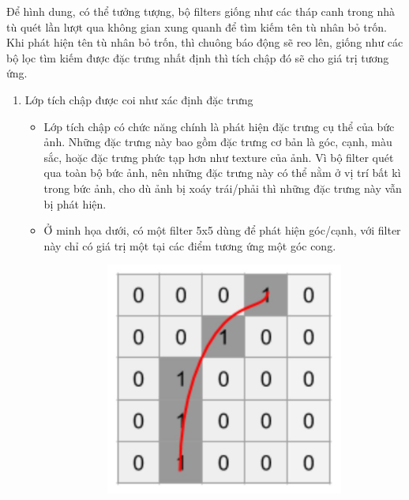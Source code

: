 Để hình dung, có thể tưởng tượng, bộ filters giống như các tháp canh trong nhà tù quét
lần lượt qua không gian xung quanh để tìm kiếm tên tù nhân bỏ trốn.
Khi phát hiện tên tù nhân bỏ trốn, thì chuông báo động sẽ reo lên, giống như các bộ lọc
tìm kiếm được đặc trưng nhất định thì tích chập đó sẽ cho giá trị tương ứng.

\begin{enumerate}
    \item Lớp tích chập được coi như xác định đặc trưng
          \begin{itemize}
              \item Lớp tích chập có chức năng chính là phát hiện đặc trưng cụ thể của bức ảnh.
                    Những đặc trưng này bao gồm đặc trưng cơ bản là góc, cạnh, màu sắc, hoặc đặc trưng
                    phức tạp hơn như texture của ảnh. Vì bộ filter quét qua toàn bộ bức ảnh, nên những
                    đặc trưng này có thể nằm ở vị trí bất kì trong bức ảnh, cho dù ảnh bị xoáy trái/phải
                    thì những đặc trưng này vẫn bị phát hiện.
              \item Ở minh họa dưới, có một filter 5x5 dùng để phát hiện góc/cạnh, với filter này
                    chỉ có giá trị một tại các điểm tương ứng một góc cong.
                    \begin{figure}
                        \begin{subfigure}{0.6\textwidth}
                            \begin{center}
                                \includegraphics[width=0.6\linewidth]{Chapters/items/chap2_3.jpg}
                            \end{center}
                            \label{fig:chap2_3}
                        \end{subfigure}

\end{figure}
\end{itemize}
\end{enumerate}
